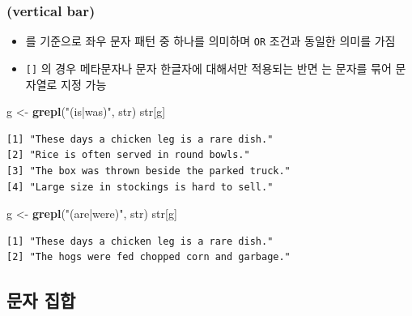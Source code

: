 \documentclass[
  11pt,
]{krantz}
\newenvironment{Shaded}{\begin{snugshade}}{\end{snugshade}}
\newcommand{\KeywordTok}[1]{\textcolor[rgb]{0.27,0.27,0.27}{\textbf{#1}}}
\newcommand{\NormalTok}[1]{#1}
\newcommand{\StringTok}[1]{\textcolor[rgb]{0.5,0.5,0.5}{#1}}
\providecommand{\tightlist}{%
  \setlength{\itemsep}{0pt}\setlength{\parskip}{0pt}}
\begin{document}
\normalsize

\hypertarget{vertical-bar}{%
\subsubsection*{\texorpdfstring{\textbf{\texttt{\textbar{}} (vertical bar)}}{\textbar{} (vertical bar)}}\label{vertical-bar}}


\begin{itemize}
\tightlist
\item
  \texttt{\textbar{}}를 기준으로 좌우 문자 패턴 중 하나를 의미하며 \texttt{OR} 조건과 동일한 의미를 가짐
\item
  \texttt{{[}{]}} 의 경우 메타문자나 문자 한글자에 대해서만 적용되는 반면 \texttt{\textbar{}}는 문자를 묶어 문자열로 지정 가능
\end{itemize}

\footnotesize

\begin{Shaded}
\begin{Highlighting}[]
\NormalTok{g <-}\StringTok{ }\KeywordTok{grepl}\NormalTok{(}\StringTok{"(is|was)"}\NormalTok{, str)}
\NormalTok{str[g]}
\end{Highlighting}
\end{Shaded}

\begin{verbatim}
[1] "These days a chicken leg is a rare dish."   
[2] "Rice is often served in round bowls."       
[3] "The box was thrown beside the parked truck."
[4] "Large size in stockings is hard to sell."   
\end{verbatim}

\begin{Shaded}
\begin{Highlighting}[]
\NormalTok{g <-}\StringTok{ }\KeywordTok{grepl}\NormalTok{(}\StringTok{"(are|were)"}\NormalTok{, str)}
\NormalTok{str[g]}
\end{Highlighting}
\end{Shaded}

\begin{verbatim}
[1] "These days a chicken leg is a rare dish."   
[2] "The hogs were fed chopped corn and garbage."
\end{verbatim}

\normalsize

\hypertarget{character-set}{%
\subsection{문자 집합}\label{character-set}}
\end{document}
